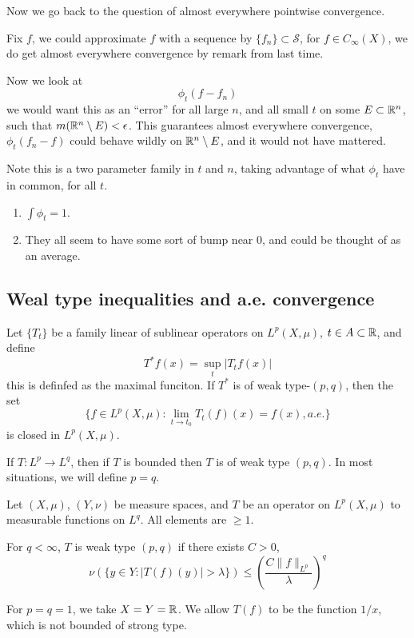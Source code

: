 Now we go back to the question of almost everywhere pointwise convergence.

Fix $f$, we could approximate $f$ with a sequence by $\{f_n\}\subset\mathcal{S}$, for $f\in C_\infty(X)$, we do get almost everywhere convergence by remark from last time.

Now we look at
\begin{equation*}
    \phi_t(f-f_n)
\end{equation*}
we would want this as an ``error'' for all large $n$, and all small $t$ on some $E\subset\mathbb{R}^n$, such that $m(\mathbb{R}^n\setminus E)<\epsilon$. This guarantees almost everywhere convergence, $\phi_t(f_n-f)$ could behave wildly on $\mathbb{R}^n\setminus E$, and it would not have mattered.

Note this is a two parameter family in $t$ and $n$, taking advantage of what $\phi_t$ have in common, for all $t$.

\begin{enumerate}
    \item $\int \phi_t=1$.
    \item They all seem to have some sort of bump near 0, and could be thought of as an average.
\end{enumerate}

\subsection{Weal type inequalities and a.e. convergence}


\begin{theorem}
    Let $\{T_t\}$ be a family linear of sublinear operators on $L^p(X,\mu)$, $t\in A\subset\mathbb{R}$, and define
    \begin{equation*}
        T^*f(x)=\sup_t|T_tf(x)|
    \end{equation*}
    this is definfed as the maximal funciton. If $T^*$ is of weak type-$(p,q)$, then the set
    \begin{equation*}
        \{f\in L^p(X,\mu): \lim_{t\to t_0}T_t(f)(x)=f(x), a.e. \}
    \end{equation*}
    is closed in $L^p(X,\mu)$.
\end{theorem}
\begin{remark}
    If $T: L^p\to L^q$, then if $T$ is bounded then $T$ is of weak type $(p,q)$. In most situations, we will define $p=q$.
\end{remark}

Let $(X,\mu)$, $(Y,\nu)$ be measure spaces, and $T$ be an operator on $L^p(X,\mu)$ to measurable functions on $L^q$. All elements are $\geq 1$.
\begin{definition}
    For $q<\infty$, $T$ is weak type $(p,q)$ if there exists $C>0$,
    \begin{equation*}
        \nu\left(\{y\in Y: |T(f)(y)|>\lambda\} \right)\leq\left(\frac{C\|f\|_{L^p}}{\lambda} \right)^q
    \end{equation*}
\end{definition}
\begin{example}
    For $p=q=1$, we take $X=Y=\mathbb{R}$. We allow $T(f)$ to be the function $1/x$, which is not bounded of strong type.
\end{example}


